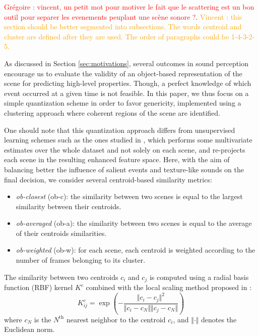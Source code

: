 \documentclass[journal]{IEEEtran}
\newcommand{\vl}[1]{\textcolor{orange}{Vincent : #1}}
\newcommand{\gl}[1]{\textcolor{red}{Gr\'egoire : #1}}
\begin{document}

\gl{vincent, un petit mot pour motiver le fait que le scattering est un bon outil pour separer les evenements peuplant une scène sonore ?}. 
\vl{this section should be better segmented into subsections. The words centroid and cluster are defined after they are used. The order of paragraphs could be 1-4-3-2-5.}

As discussed in Section \ref{sec:motivations}, several outcomes in sound perception encourage us to evaluate the validity of an object-based representation of the scene for predicting high-level properties. Though, a perfect knowledge of which event occurred at a given time is not feasible. In this paper, we thus focus on a simple quantization scheme in order to favor genericity, implemented using a clustering approach where coherent regions of the scene are identified.

One should note that this quantization approach differs from unsupervised learning schemes such as the ones studied in \cite{bisot2016acoustic}, which performs some multivariate estimates over the whole dataset and not solely on each scene, and re-projects each scene in the resulting enhanced feature space.
Here, with the aim of balancing better the influence of salient events and texture-like sounds on the final decision, we consider several centroid-based similarity metrics:

\begin{itemize}
\item \emph{ob-closest} (ob-c): the similarity between two scenes is equal to the largest similarity between their centroids.
\item \emph{ob-averaged} (ob-a): the similarity between two scenes is equal to the average of their centroids similarities.
\item \emph{ob-weighted} (ob-w): for each scene, each centroid is weighted according to the number of frames belonging to its cluster.
\end{itemize}

The similarity between two centroids $c_i$ and $c_j$ is computed using a radial basis function (RBF) kernel $K^c$ combined with the local scaling method proposed in \cite{selfTuneManor2004}:
\begin{equation}
\label{eq:kc}
K^c_{ij} = \exp\left( - \dfrac{\Vert c_i - c_j \Vert^2}{\Vert c_i - c_N \Vert \Vert c_j - c_N \Vert} \right) 
\end{equation}
where $c_N$ is the $N^{\textrm{th}}$ nearest neighbor to the centroid $c_i$, and $\Vert \cdot \Vert$ denotes the Euclidean norm. 
\end{document}
